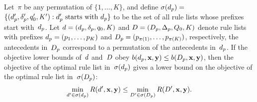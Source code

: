 \begin{theorem}
\label{thm:permutation}
Let~$\pi$ be any permutation of ${\{1, \dots, K\}}$,
and define ${\sigma(d_p) = }$
${\{(d_p', \delta_p', q_0', K') : d_p' \textnormal{ starts with } d_p \}}$
to be the set of all rule lists whose prefixes start with~$d_p$.
%
Let ${{d} = (d_p, \delta_p, q_0, K)}$
and ${{D} = (D_p, \Delta_p, Q_0, K)}$
denote rule lists with prefixes ${d_p = (p_1, \dots, p_K)}$
and ${D_p = (p_{\pi(1)}, \dots, p_{\pi(K)})}$,
respectively, \ie the antecedents in~$D_p$
correspond to a permutation of the antecedents in~$d_p$.
%
If the objective lower bounds of~${d}$ and~${D}$
obey ${b(d_p, \mathbf{x}, \mathbf{y}) \le b(D_p, \mathbf{x}, \mathbf{y})}$,
then the objective of the optimal rule list in~$\sigma(d_p)$ gives a
lower bound on the objective of the optimal rule list in~$\sigma(D_p)$:
\begin{align}
\min_{\RL' \in \StartsWith(\Prefix)} \Obj(\RL', \x, \y)
\le \min_{\RLB' \in \StartsWith(\PrefixB)} \Obj(\RLB', \x, \y).
\label{eq:permutation}
\end{align}
\end{theorem}


